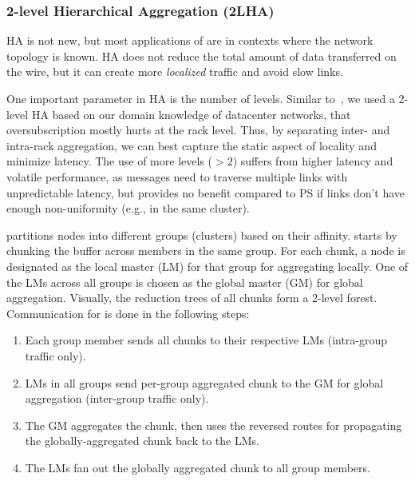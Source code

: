 \subsubsection{2-level Hierarchical Aggregation (2LHA)}
HA is not new, but most applications of \mlha are in contexts where the network topology is known. HA does not reduce the total amount of data transferred on the wire, but it can create more \textit{localized} traffic and avoid slow links.


One important parameter in HA is the number of levels. Similar to~\cite{cool}, we used a 2-level HA based on our domain knowledge of datacenter networks, that oversubscription mostly hurts at the rack level. Thus, by separating inter- and intra-rack aggregation, we can best capture the static aspect of locality and minimize latency. The use of more levels ($>2$) suffers from higher latency and volatile performance, as messages need to traverse multiple links with unpredictable latency, but provides no benefit compared to PS if links don't have enough non-uniformity (e.g., in the same cluster). %


\label{sec:2lhaOverview}
\mlha partitions nodes into different groups (clusters) based on their affinity. \mlha starts by chunking the buffer across members in the same group. For each chunk, a node is designated as the local master (LM) for that group for aggregating locally. One of the LMs across all groups is chosen as the global master (GM) for global aggregation. Visually, the reduction trees of all chunks form a 2-level forest. Communication for \mlha is done in the following steps: 

\begin{enumerate}[noitemsep,topsep=0pt,parsep=0pt,partopsep=0pt]
  \item Each group member sends all chunks to their respective LMs (intra-group traffic only).
  \item LMs in all groups send per-group aggregated chunk to the GM for global aggregation (inter-group traffic only).
  \item The GM aggregates the chunk, then uses the reversed routes for propagating the globally-aggregated chunk back to the LMs.
  \item The LMs fan out the globally aggregated chunk to all group members.
\end{enumerate}

